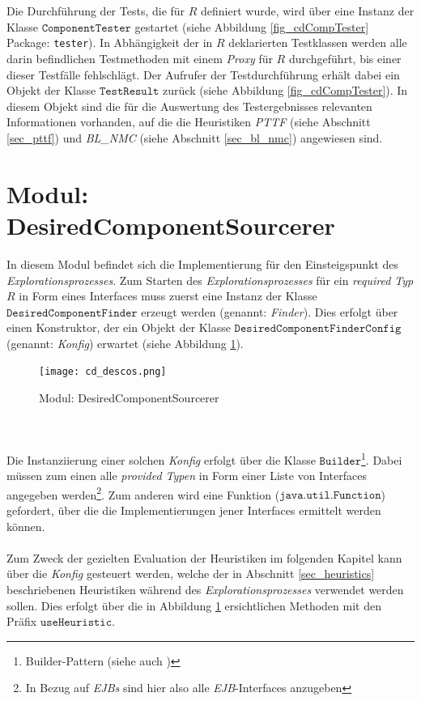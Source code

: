 \\\\
Die Durchführung der Tests, die für $R$ definiert wurde, wird über eine Instanz der Klasse $\texttt{ComponentTester}$ gestartet (siehe Abbildung \ref{fig_cdCompTester} Package: \texttt{tester}). In Abhängigkeit der in $R$ deklarierten Testklassen werden alle darin befindlichen Testmethoden mit einem \emph{Proxy} für $R$ durchgeführt, bis einer dieser Testfälle fehlschlägt. Der Aufrufer der Testdurchführung erhält dabei ein Objekt der Klasse $\texttt{TestResult}$ zurück (siehe Abbildung \ref{fig_cdCompTester}). In diesem Objekt sind die für die Auswertung des Testergebnisses relevanten Informationen vorhanden, auf die die \Gls{Heuristik}en \emph{PTTF} (siehe Abschnitt \ref{sec_pttf}) und \emph{BL\_NMC} (siehe Abschnitt \ref{sec_bl_nmc}) angewiesen sind.
\section{Modul: DesiredComponentSourcerer}\label{sec_impl_descos}
In diesem \Gls{Modul} befindet sich die Implementierung für den Einsteigspunkt des \emph{Explorationsprozesses}. Zum Starten des \emph{Explorationsprozesses} für ein \emph{required Typ} $R$ in Form eines \Gls{Interface}s muss zuerst eine Instanz der Klasse $\texttt{DesiredComponentFinder}$ erzeugt werden (genannt: \emph{Finder}). Dies erfolgt über einen Konstruktor, der ein Objekt der Klasse \linebreak$\texttt{DesiredComponentFinderConfig}$ (genannt: \emph{Konfig}) erwartet (siehe Abbildung \ref{cd_descos}). 
\begin{figure}[h!]
\centering
\texttt{[image: cd\_descos.png]}
\caption{Modul: DesiredComponentSourcerer}
\label{cd_descos}
\end{figure}
\noindent
\\\\
Die Instanziierung einer solchen \emph{Konfig} erfolgt über die Klasse $\texttt{Builder}$\footnote{Builder-Pattern (siehe auch \cite{patterns})}. Dabei müssen zum einen alle  \emph{provided Typen} in Form einer Liste von \Gls{Interface}s angegeben werden\footnote{In Bezug auf \emph{EJBs} sind hier also alle \emph{EJB}-\Gls{Interface}s anzugeben}. Zum anderen wird eine Funktion ($\texttt{java.util.Function}$) gefordert, über die die Implementierungen jener \Gls{Interface}s ermittelt werden können.
\\\\
Zum Zweck der gezielten Evaluation der \Gls{Heuristik}en im folgenden Kapitel kann über die \emph{Konfig} gesteuert werden, welche der in Abschnitt \ref{sec_heuristics} beschriebenen \Gls{Heuristik}en während des \emph{Explorationsprozesses} verwendet werden sollen. Dies erfolgt über die in Abbildung \ref{cd_descos} ersichtlichen Methoden mit den Präfix $\texttt{useHeuristic}$.
